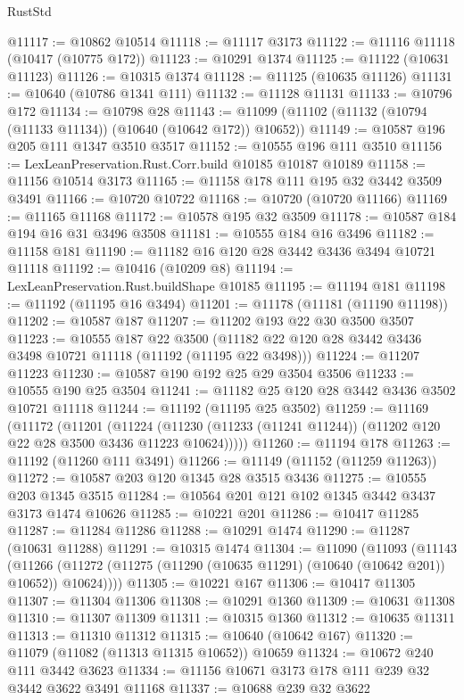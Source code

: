 \begin{lexlean}{RustStd}
\begin{coremodule}
@11117 := @10862 @10514
@11118 := @11117 @3173
@11122 := @11116 @11118 (@10417 (@10775 @172))
@11123 := @10291 @1374
@11125 := @11122 (@10631 @11123)
@11126 := @10315 @1374
@11128 := @11125 (@10635 @11126)
@11131 := @10640 (@10786 @1341 @111)
@11132 := @11128 @11131
@11133 := @10796 @172
@11134 := @10798 @28
@11143 := @11099 (@11102 (@11132 (@10794 (@11133 @11134)) (@10640 (@10642 @172)) @10652))
@11149 := @10587 @196 @205 @111 @1347 @3510 @3517
@11152 := @10555 @196 @111 @3510
@11156 := LexLeanPreservation.Rust.Corr.build @10185 @10187 @10189
@11158 := @11156 @10514 @3173
@11165 := @11158 @178 @111 @195 @32 @3442 @3509 @3491
@11166 := @10720 @10722
@11168 := @10720 (@10720 @11166)
@11169 := @11165 @11168
@11172 := @10578 @195 @32 @3509
@11178 := @10587 @184 @194 @16 @31 @3496 @3508
@11181 := @10555 @184 @16 @3496
@11182 := @11158 @181
@11190 := @11182 @16 @120 @28 @3442 @3436 @3494 @10721 @11118
@11192 := @10416 (@10209 @8)
@11194 := LexLeanPreservation.Rust.buildShape @10185
@11195 := @11194 @181
@11198 := @11192 (@11195 @16 @3494)
@11201 := @11178 (@11181 (@11190 @11198))
@11202 := @10587 @187
@11207 := @11202 @193 @22 @30 @3500 @3507
@11223 := @10555
    @187
    @22
    @3500
    (@11182 @22 @120 @28 @3442 @3436 @3498 @10721 @11118 (@11192 (@11195 @22 @3498)))
@11224 := @11207 @11223
@11230 := @10587 @190 @192 @25 @29 @3504 @3506
@11233 := @10555 @190 @25 @3504
@11241 := @11182 @25 @120 @28 @3442 @3436 @3502 @10721 @11118
@11244 := @11192 (@11195 @25 @3502)
@11259 := @11169
    (@11172
      (@11201
        (@11224 (@11230 (@11233 (@11241 @11244)) (@11202 @120 @22 @28 @3500 @3436 @11223 @10624)))))
@11260 := @11194 @178
@11263 := @11192 (@11260 @111 @3491)
@11266 := @11149 (@11152 (@11259 @11263))
@11272 := @10587 @203 @120 @1345 @28 @3515 @3436
@11275 := @10555 @203 @1345 @3515
@11284 := @10564 @201 @121 @102 @1345 @3442 @3437 @3173 @1474 @10626
@11285 := @10221 @201
@11286 := @10417 @11285
@11287 := @11284 @11286
@11288 := @10291 @1474
@11290 := @11287 (@10631 @11288)
@11291 := @10315 @1474
@11304 := @11090
    (@11093
      (@11143
        (@11266 (@11272 (@11275 (@11290 (@10635 @11291) (@10640 (@10642 @201)) @10652)) @10624))))
@11305 := @10221 @167
@11306 := @10417 @11305
@11307 := @11304 @11306
@11308 := @10291 @1360
@11309 := @10631 @11308
@11310 := @11307 @11309
@11311 := @10315 @1360
@11312 := @10635 @11311
@11313 := @11310 @11312
@11315 := @10640 (@10642 @167)
@11320 := @11079 (@11082 (@11313 @11315 @10652)) @10659
@11324 := @10672 @240 @111 @3442 @3623
@11334 := @11156 @10671 @3173 @178 @111 @239 @32 @3442 @3622 @3491 @11168
@11337 := @10688 @239 @32 @3622

\end{coremodule}
\end{lexlean}

